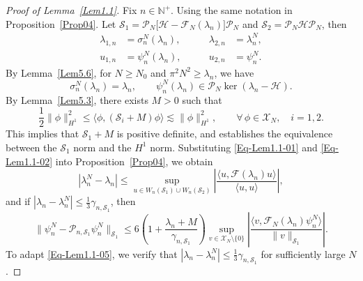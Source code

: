 \documentclass[10pt,a4paper]{amsart}
\begin{document}
\begin{proof}[Proof of Lemma~\ref{Lem1.1}]

Fix $n \in \mathbb{N}^+$. Using the same notation in Proposition~\ref{Prop04}. Let $\mathcal{S}_1 = \mathcal{P}_N \bigl[\mathcal{H} - \mathcal{F}_N(\lambda_n)\bigr] \mathcal{P}_N$ and $\mathcal{S}_2 = \mathcal{P}_N \mathcal{H} \mathcal{P}_N$, then
\begin{equation} \label{Eq-Lem1.1-01}
    \begin{aligned}
    \lambda_{1,n} &= \sigma_n^N(\lambda_n), \qquad &\lambda_{2,n} &= \lambda_n^N, \\
    u_{1,n} &= \psi_n^N(\lambda_n), \qquad &u_{2,n} &= \psi_n^N.
    \end{aligned}
\end{equation}
By Lemma~\ref{Lem5.6}, for $N \geq N_0$ and $\pi^2 N^2 \geq \lambda_n$, we have
\begin{equation}\label{Eq-Lem1.1-02}
    \sigma_n^N(\lambda_n) = \lambda_n, \qquad \psi_n^N(\lambda_n) \in \mathcal{P}_N \operatorname{ker}(\lambda_n - \mathcal{H}).
\end{equation}
By Lemma~\ref{Lem5.3}, there exists $M > 0$ such that 
\begin{equation}\label{Eq-Lem1.1-03}
    \frac{1}{2} \|\phi\|_{H^1}^2 \leq \langle \phi, (\mathcal{S}_i + M) \phi \rangle \lesssim \|\phi\|_{H^1}^2, \qquad \forall\, \phi \in \mathscr{X}_N, \quad i = 1, 2.
\end{equation}
This implies that $\mathcal{S}_1 + M $ is positive definite, and establishes the equivalence between the $\mathcal{S}_1$ norm and the $H^1$ norm. Substituting \eqref{Eq-Lem1.1-01} and \eqref{Eq-Lem1.1-02} into Proposition~\ref{Prop04}, we obtain
\begin{equation}\label{Eq-Lem1.1-04}
    |\lambda_n^N - \lambda_n| \leq 
    \sup_{u \in W_n(\mathcal{S}_1) \cup W_n(\mathcal{S}_2)}
    \left|
    \frac{\langle u, \mathcal{F}(\lambda_n) u \rangle}{\langle u, u \rangle}
    \right|,
\end{equation}
and if $ |\lambda_n - \lambda_n^N| \leq \frac{1}{3} \gamma_{n, \mathcal{S}_1} $, then
\begin{equation}\label{Eq-Lem1.1-05}
    \|\psi_n^N - \mathcal{P}_{n,\mathcal{S}_1}\psi_n^N\|_{\mathcal{S}_1}
    \leq 6\left(1 + \frac{\lambda_n + M}{\gamma_{n, \mathcal{S}_1}}\right)
    \sup_{v \in \mathscr{X}_N \setminus \{0\}}
    \left|
    \frac{\langle v, \mathcal{F}_N(\lambda_n) \psi_n^N \rangle}{\|v\|_{\mathcal{S}_1}}
    \right|.
\end{equation}
To adapt \eqref{Eq-Lem1.1-05}, we verify that $|\lambda_n-\lambda_n^N|\leq \tfrac{1}{3}\gamma_{n,\mathcal{S}_1}$ for sufficiently large $N$. 


\end{proof}
\end{document}
